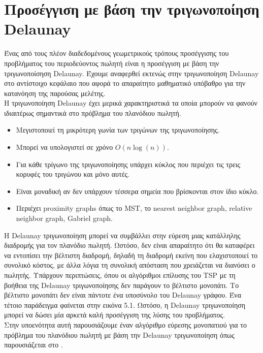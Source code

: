 \documentclass[oneside,12pt]{book}
\theoremstyle{definition}
\begin{document}
\section{Προσέγγιση με βάση την τριγωνοποίηση Delaunay}

Ένας από τους πλέον διαδεδομένους γεωμετρικούς τρόπους προσέγγισης του προβλήματος του περιοδεύοντος πωλητή είναι η προσέγγιση με βάση την τριγωνοποίσηση Delaunay. Έχουμε αναφερθεί εκτενώς στην τριγωνοποίηση Delaunay στο αντίστοιχο κεφάλαιο που αφορά το απαραίτητο μαθηματικό υπόβαθρο για την κατανόηση της παρούσας μελέτης. \\

Η τριγωνοποίηση Delaunay έχει μερικά χαρακτηριστικά τα οποία μπορούν να φανούν ιδιαιτέρως σημαντικά στο πρόβλημα του πλανόδιου πωλητή. 

\begin{itemize}
	\item Μεγιστοποιεί τη μικρότερη γωνία των τριγώνων της τριγωνοποίησης.
	\item Μπορεί να υπολογιστεί σε χρόνο \(Ο(n \log(n))\).
	\item Για κάθε τρίγωνο της τριγωνοποίησης υπάρχει κύκλος που περιέχει τις τρεις κορυφές του τριγώνου και μόνο αυτές.
	\item Είναι μοναδική αν δεν υπάρχουν τέσσερα σημεία που βρίσκονται στον ίδιο κύκλο.
	\item Περιέχει proximity graphs όπως το MST, το nearest neighbor graph, relative neighbor graph, Gabriel graph.
\end{itemize}

Η Delaunay τριγωνοποίηση μπορεί να συμβάλλει στην εύρεση μιας κατάλληλης διαδρομής για τον πλανόδιο πωλητή. Ωστόσο, δεν είναι απαραίτητο ότι θα καταφέρει να εντοπίσει την βέλτιστη διαδρομή, δηλαδή τη διαδρομή εκείνη που ελαχιστοποιεί το συνολικό κόστος, με άλλα λόγια τη συνολική απόσταση που χρειάζεται να διανύσει ο πωλητής. Υπάρχουν περιπτώσεις, όπου οι αλγόριθμοι επίλυσης του TSP με τη βοήθεια της Delaunay τριγωνοποίησης δεν παράγουν το βέλτιστο μονοπάτι. Το βέλτιστο μονοπάτι δεν είναι πάντοτε ένα υποσύνολο του Delaunay γράφου. Ένα τέτοιο παράδειγμα φαίνεται στην εικόνα 5.1. Ωστόσο, η Delaunay τριγωνοποίηση μπορεί να δώσει μία αρκετά καλή προσέγγιση της λύσης του προβλήματος. \\

Στην υποενότητα αυτή παρουσιάζουμε έναν αλγόριθμο εύρεσης μονοπατιού για το πρόβλημα του πλανόδιου πωλητή με βάση την Delaunay τριγωνοποίηση όπως παρουσιάζεται στο \cite{10}. \\
\end{document}
